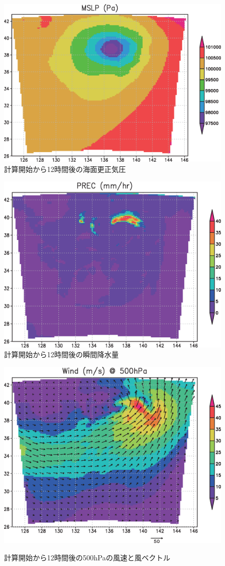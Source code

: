 \begin{figure}[h]
\begin{center}
  \includegraphics[width=0.55\hsize]{./figure/real_mslp.eps}\\
  \caption{計算開始から12時間後の海面更正気圧}
  \label{fig:real_mslp}
\end{center}
\begin{center}
  \includegraphics[width=0.55\hsize]{./figure/real_prec.eps}\\
  \caption{計算開始から12時間後の瞬間降水量}
  \label{fig:real_prec}
\end{center}
\begin{center}
  \includegraphics[width=0.55\hsize]{./figure/real_wind.eps}\\
  \caption{計算開始から12時間後の500hPaの風速と風ベクトル}
  \label{fig:real_wind}
\end{center}
\end{figure}



